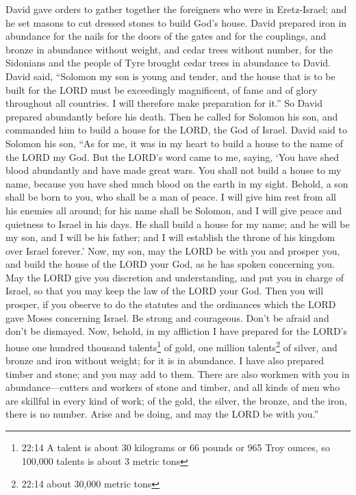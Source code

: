 \quad\quad \myverse{}David gave orders to gather together the foreigners who were in
Eretz-Israel; and he set masons to cut dressed stones to build God’s house.
\myverse{}David prepared iron in abundance for the nails for the doors of the gates and
for the couplings, and bronze in abundance without weight,
\myverse{}and cedar trees without number, for the Sidonians and the people of Tyre brought
cedar trees in abundance to David.
\myverse{}David said, “Solomon my son is young and tender, and the house that is to be
built for the LORD must be exceedingly magnificent, of fame and of glory throughout all countries. I will
therefore make preparation for it.” So David prepared abundantly before his death.
\myverse{}Then he called for Solomon his son, and commanded him to build a house for
the LORD, the God of Israel.
\myverse{}David said to Solomon his son, “As for me, it was in my heart to build a house
to the name of the LORD my God.
\myverse{}But the LORD’s word came to me, saying, ‘You have shed blood abundantly and
have made great wars. You shall not build a house to my name, because you have shed much blood on the
earth in my sight.
\myverse{}Behold, a son shall be born to you, who shall be a man of peace. I will give
him rest from all his enemies all around; for his name shall be Solomon, and I will give peace and quietness
to Israel in his days.
\myverse{}He shall build a house for my name; and he will be my son, and I will be
his father; and I will establish the throne of his kingdom over Israel forever.’
\myverse{}Now, my son, may the LORD be with you and prosper you, and build the house
of the LORD your God, as he has spoken concerning you.
\myverse{}May the LORD give you discretion and understanding, and put you in charge
of Israel, so that you may keep the law of the LORD your God.
\myverse{}Then you will prosper, if you observe to do the statutes and the ordinances
which the LORD gave Moses concerning Israel. Be strong and courageous. Don’t be afraid and don’t be dismayed.
\myverse{}Now, behold, in my affliction I have prepared for the LORD’s house one hundred
thousand talents\footnote{22:14 A talent is about 30 kilograms or 66 pounds or 965 Troy ounces, so 100,000 talents is about 3
	metric tons} of gold, one million talents\footnote{22:14 about 30,000 metric tons} of silver, and bronze and iron without weight; for it is in
abundance. I have also prepared timber and stone; and you may add to them.
\myverse{}There are also workmen with you in abundance—cutters and workers of stone
and timber, and all kinds of men who are skillful in every kind of work;
\myverse{}of the gold, the silver, the bronze, and the iron, there is no number. Arise
and be doing, and may the LORD be with you.”

